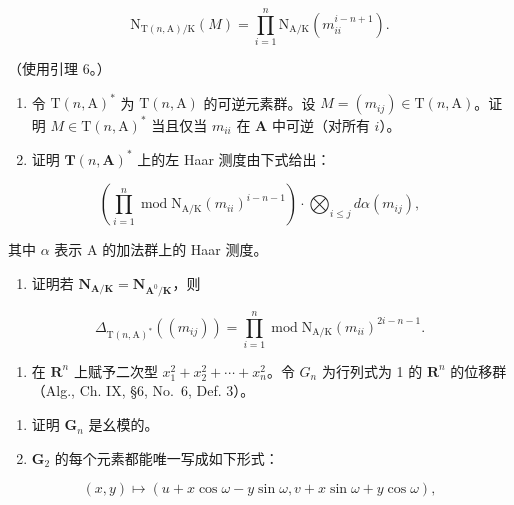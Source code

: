 \[
\mathrm{N} _ {\mathrm{T} (n, \mathrm{A}) / \mathrm{K}} (M) = \prod_ {i = 1} ^ {n} \mathrm{N} _ {\mathrm{A} / \mathrm{K}} (m _ {i i} ^ {i - n + 1}).
\]

（使用引理 6。）

\begin{enumerate}
\def\labelenumi{\alph{enumi})}
\setcounter{enumi}{1}
\item
  令 \(\mathrm{T}(n,\mathrm{A})^*\) 为 \(\mathrm{T}(n,\mathrm{A})\) 的可逆元素群。设 \(M = (m_{ij}) \in \mathrm{T}(n,\mathrm{A})\)。证明 \(M \in \mathrm{T}(n,\mathrm{A})^*\) 当且仅当 \(m_{ii}\) 在 \(\mathbf{A}\) 中可逆（对所有 \(i\)）。
\item
  证明 \(\mathbf{T}(n,\mathbf{A})^{*}\) 上的左 Haar 测度由下式给出：
\end{enumerate}

\[
\left(\prod_ {i = 1} ^ {n} \operatorname{mod} \mathrm{N} _ {\mathrm{A} / \mathrm{K}} (m _ {i i}) ^ {i - n - 1}\right) \cdot \bigotimes_ {i \leqslant j} d \alpha (m _ {i j}),
\]

其中 \(\alpha\) 表示 A 的加法群上的 Haar 测度。

\begin{enumerate}
\def\labelenumi{\alph{enumi})}
\setcounter{enumi}{3}
\tightlist
\item
  证明若 \(\mathbf{N}_{\mathbf{A} / \mathbf{K}} = \mathbf{N}_{\mathbf{A}^0 /\mathbf{K}}\)，则
\end{enumerate}

\[
\Delta_ {\mathrm{T} (n, \mathrm{A}) ^ {*}} \left(\left(m _ {i j}\right)\right) = \prod_ {i = 1} ^ {n} \operatorname{mod} \mathrm{N} _ {\mathrm{A} / \mathrm{K}} \left(m _ {i i}\right) ^ {2 i - n - 1}.
\]

\begin{enumerate}
\def\labelenumi{\arabic{enumi})}
\setcounter{enumi}{4}
\tightlist
\item
  在 \(\mathbf{R}^{n}\) 上赋予二次型 \(x_{1}^{2} + x_{2}^{2} + \cdots + x_{n}^{2}\)。令 \(G_{n}\) 为行列式为 1 的 \(\mathbf{R}^{n}\) 的位移群（Alg., Ch. IX, §6, No.~6, Def. 3）。
\end{enumerate}

\begin{enumerate}
\def\labelenumi{\alph{enumi})}
\item
  证明 \(\mathbf{G}_n\) 是幺模的。
\item
  \(\mathbf{G}_2\) 的每个元素都能唯一写成如下形式：
\end{enumerate}

\[
(x, y) \mapsto (u + x \cos \omega - y \sin \omega , v + x \sin \omega + y \cos \omega),
\]

